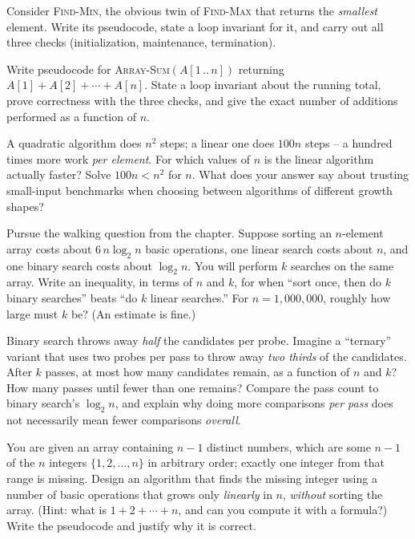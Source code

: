 \begin{exercise}
Consider \textsc{Find-Min}, the obvious twin of \textsc{Find-Max} that returns the
\emph{smallest} element. Write its pseudocode, state a loop invariant for it, and
carry out all three checks (initialization, maintenance, termination).
\end{exercise}

\begin{exercise}
Write pseudocode for \textsc{Array-Sum}$(A[1\,..\,n])$ returning
$A[1] + A[2] + \cdots + A[n]$. State a loop invariant about the running total, prove
correctness with the three checks, and give the exact number of additions performed
as a function of $n$.
\end{exercise}

\begin{exercise}
A quadratic algorithm does $n^2$ steps; a linear one does $100n$ steps -- a hundred
times more work \emph{per element}. For which values of $n$ is the linear algorithm
actually faster? Solve $100n < n^2$ for $n$. What does your answer say about trusting
small-input benchmarks when choosing between algorithms of different growth shapes?
\end{exercise}

\begin{exercise}
Pursue the walking question from the chapter. Suppose sorting an $n$-element array
costs about $6\,n\log_2 n$ basic operations, one linear search costs about $n$, and
one binary search costs about $\log_2 n$. You will perform $k$ searches on the same
array. Write an inequality, in terms of $n$ and $k$, for when ``sort once, then do
$k$ binary searches'' beats ``do $k$ linear searches.'' For $n = 1{,}000{,}000$,
roughly how large must $k$ be? (An estimate is fine.)
\end{exercise}

\begin{exercise}
Binary search throws away \emph{half} the candidates per probe. Imagine a
``ternary'' variant that uses two probes per pass to throw away \emph{two thirds} of
the candidates. After $k$ passes, at most how many candidates remain, as a function
of $n$ and $k$? How many passes until fewer than one remains? Compare the pass count
to binary search's $\log_2 n$, and explain why doing more comparisons \emph{per pass}
does not necessarily mean fewer comparisons \emph{overall}.
\end{exercise}

\begin{exercise}
You are given an array containing $n-1$ distinct numbers, which are some $n-1$ of the
$n$ integers $\{1, 2, \dots, n\}$ in arbitrary order; exactly one integer from that
range is missing. Design an algorithm that finds the missing integer using a number
of basic operations that grows only \emph{linearly} in $n$, \emph{without} sorting
the array. (Hint: what is $1 + 2 + \cdots + n$, and can you compute it with a
formula?) Write the pseudocode and justify why it is correct.
\end{exercise}
